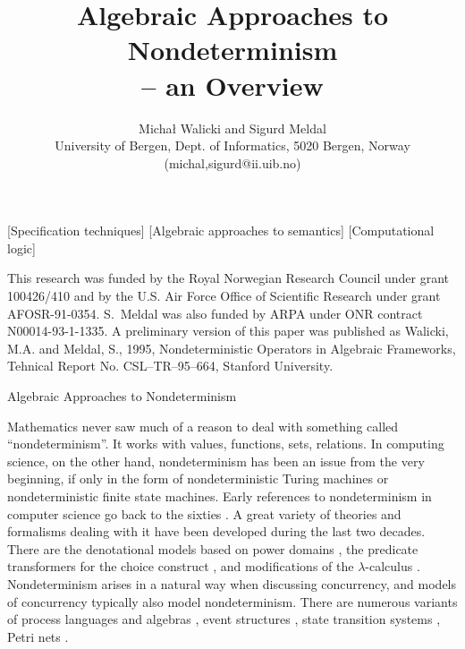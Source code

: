        

\title{Algebraic Approaches to Nondeterminism\\ -- an Overview}
\author{Micha{\l} Walicki and Sigurd Meldal\\
 University of Bergen, Dept. of Informatics, 
         5020 Bergen, Norway
         {\small{(michal,sigurd@ii.uib.no)}} }
[Specification techniques]
[Algebraic approaches to semantics]
[Computational logic]



\begin{bottomstuff}
This research was funded 
by the Royal Norwegian Research Council under grant 100426/410 and by the 
U.S. Air Force Office of Scientific Research under grant AFOSR-91-0354. 
S.~Meldal was also funded by ARPA under ONR contract N00014-93-1-1335. 
A preliminary version of this paper was published as Walicki, M.A. and 
Meldal, S., 1995, Nondeterministic Operators in Algebraic Frameworks, 
Tehnical Report No. CSL--TR--95--664, Stanford University.
\end{bottomstuff}

	 {Algebraic Approaches to Nondeterminism}


\maketitle
\vspace*{-6ex}
{\footnotesize{\tableofcontents}}  
\vspace{4ex}

\noindent Mathematics never saw much of a reason to deal with something 
called ``nondeterminism''.  It works with values, functions, sets, 
relations.  In computing science, on the other hand, nondeterminism has 
been an issue from the very beginning, if only in the form of 
nondeterministic Turing machines or nondeterministic finite state machines.  
Early references to nondeterminism in computer science go back to the 
sixties \cite{c:38,c:84}.  A great variety of theories and formalisms 
dealing with it have been developed during the last two decades.  There are 
the denotational models based on power domains \cite{c:103, c:117, c:51, 
c:106}, the predicate transformers for the choice construct \cite{c:29, 
c:30, c:Hes, c:Nel, c:104, c:118}, and modifications of the $\lambda$-calculus 
\cite{c:73, c:4, c:49}.  Nondeterminism arises in a natural way when 
discussing concurrency, and models of concurrency typically also model 
nondeterminism.  There are numerous variants of process languages and 
algebras \cite{c:13, c:89, c:90, c:101a, c:50, c:54, c:52, c:65, c:39, c:11}, event 
structures \cite{c:2, c:136, c:135, c:134}, state transition systems 
\cite{c:83, c:71}, Petri nets \cite{c:100, c:109}.

